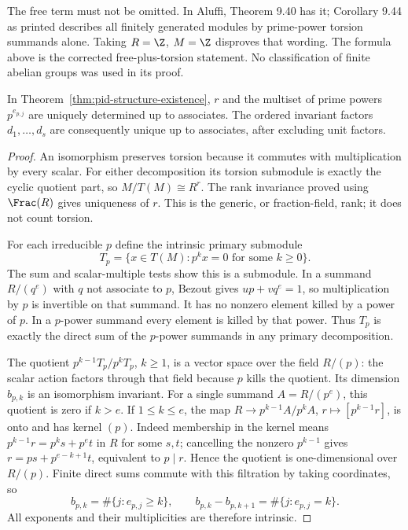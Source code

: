 The free term must not be omitted. In Aluffi, Theorem 9.40 has it;
Corollary 9.44 as printed describes all finitely generated modules by
prime-power torsion summands alone. Taking $R=\Z$, $M=\Z$ disproves
that wording. The formula above is the corrected free-plus-torsion
statement. No classification of finite abelian groups was used in its proof.

\begin{theorem}\label{thm:pid-structure-uniqueness}
In Theorem~\ref{thm:pid-structure-existence}, $r$ and the multiset of
prime powers $p^{e_{p,j}}$ are uniquely determined up to associates.
The ordered invariant factors $d_1,\ldots,d_s$ are consequently unique
up to associates, after excluding unit factors.
\end{theorem}
\begin{proof}
An isomorphism preserves torsion because it commutes with multiplication
by every scalar. For either decomposition its torsion submodule is
exactly the cyclic quotient part, so $M/T(M)\cong R^r$.
The rank invariance proved using $\Frac(R)$ gives uniqueness of $r$.
This is the generic, or fraction-field, rank; it does not count torsion.

For each irreducible $p$ define the intrinsic primary submodule
\[
 T_p=\{x\in T(M):p^k x=0\text{ for some }k\ge0\}.
\]
The sum and scalar-multiple tests show this is a submodule.
In a summand $R/(q^e)$ with $q$ not associate to $p$, Bezout gives
$up+vq^e=1$, so multiplication by $p$ is invertible on that summand.
It has no nonzero element killed by a power of $p$.
In a $p$-power summand every element is killed by that power.
Thus $T_p$ is exactly the direct sum of the $p$-power summands in
any primary decomposition.

The quotient
$p^{k-1}T_p/p^kT_p$, $k\ge1$, is a vector space over the field
$R/(p)$: the scalar action factors through that field because $p$
kills the quotient. Its dimension $b_{p,k}$ is an isomorphism invariant.
For a single summand $A=R/(p^e)$, this quotient is zero if $k>e$.
If $1\le k\le e$, the map
$R\to p^{k-1}A/p^k A$, $r\mapsto[p^{k-1}r]$, is onto and has
kernel $(p)$. Indeed membership in the kernel means
$p^{k-1}r=p^k s+p^e t$ in $R$ for some $s,t$; cancelling the nonzero
$p^{k-1}$ gives $r=ps+p^{e-k+1}t$, equivalent to $p\mid r$.
Hence the quotient is one-dimensional over $R/(p)$.
Finite direct sums commute with this filtration by taking coordinates,
so
\[
 b_{p,k}=\#\{j:e_{p,j}\ge k\},\qquad
 b_{p,k}-b_{p,k+1}=\#\{j:e_{p,j}=k\}.
\]
All exponents and their multiplicities are therefore intrinsic.


\end{proof}
